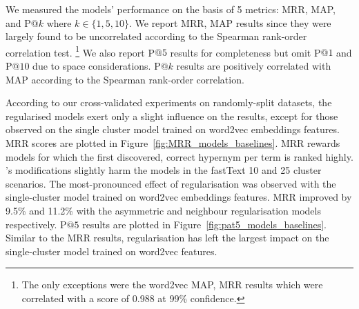 We measured the models' performance on the basis of 5 metrics: \ac{MRR}, \ac{MAP}, and P$@k$ where $k \in \{1, 5, 10\}$.  We report MRR, MAP results since they were largely found to be uncorrelated according to the Spearman rank-order correlation test. \footnote{The only exceptions were the word2vec MAP, MRR results which were correlated with a score of 0.988 at 99\% confidence.}   We also report P$@5$ results for completeness but omit P$@1$ and P$@10$ due to space considerations.  P$@k$ results are positively correlated with \ac{MAP} according to the Spearman rank-order correlation.

According to our cross-validated experiments on randomly-split datasets, the regularised models exert only a slight influence on the results, except for those observed on the single cluster model trained on word2vec embeddings features.  MRR scores are plotted in Figure~\ref{fig:MRR_models_baselines}.  MRR rewards models for which the first discovered, correct hypernym per term is ranked highly.  \citeauthor{ustalov2017negative}'s modifications slightly harm the models in the fastText 10 and 25 cluster scenarios.  The most-pronounced effect of regularisation was observed with the single-cluster model trained on word2vec embeddings features.  MRR improved by 9.5\% and 11.2\%  with the asymmetric and neighbour regularisation models respectively.  P$@5$ results are plotted in Figure~\ref{fig:pat5_models_baselines}.  Similar to the MRR results, regularisation has left the largest impact on the single-cluster model trained on word2vec features.
